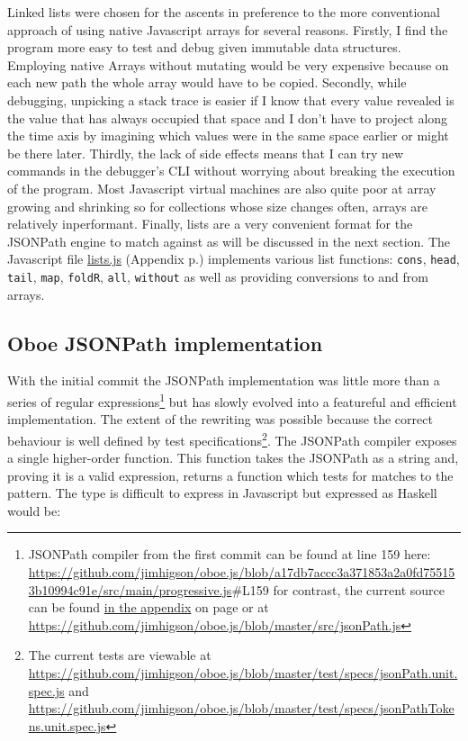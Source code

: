 \documentclass[12pt, ]{article}
\begin{document}
Linked lists were chosen for the ascents in preference to the more
conventional approach of using native Javascript arrays for several
reasons. Firstly, I find the program more easy to test and debug given
immutable data structures. Employing native Arrays without mutating
would be very expensive because on each new path the whole array would
have to be copied. Secondly, while debugging, unpicking a stack trace is
easier if I know that every value revealed is the value that has always
occupied that space and I don't have to project along the time axis by
imagining which values were in the same space earlier or might be there
later. Thirdly, the lack of side effects means that I can try new
commands in the debugger's CLI without worrying about breaking the
execution of the program. Most Javascript virtual machines are also
quite poor at array growing and shrinking so for collections whose size
changes often, arrays are relatively inperformant. Finally, lists are a
very convenient format for the JSONPath engine to match against as will
be discussed in the next section. The Javascript file
\hyperref[headerux5flists]{lists.js} (Appendix p.\pageref{src_lists})
implements various list functions: \texttt{cons}, \texttt{head},
\texttt{tail}, \texttt{map}, \texttt{foldR}, \texttt{all},
\texttt{without} as well as providing conversions to and from arrays.

\subsection{Oboe JSONPath
implementation}\label{oboe-jsonpath-implementation}

With the initial commit the JSONPath implementation was little more than
a series of regular expressions\footnote{JSONPath compiler from the
  first commit can be found at line 159 here:
  \url{https://github.com/jimhigson/oboe.js/blob/a17db7accc3a371853a2a0fd755153b10994c91e/src/main/progressive.js}\#L159
  for contrast, the current source can be found
  \hyperref[jsonPath.js]{in the appendix} on page \pageref{src_jsonPath}
  or at
  \url{https://github.com/jimhigson/oboe.js/blob/master/src/jsonPath.js}}
but has slowly evolved into a featureful and efficient implementation.
The extent of the rewriting was possible because the correct behaviour
is well defined by test specifications\footnote{The current tests are
  viewable at
  \url{https://github.com/jimhigson/oboe.js/blob/master/test/specs/jsonPath.unit.spec.js}
  and
  \url{https://github.com/jimhigson/oboe.js/blob/master/test/specs/jsonPathTokens.unit.spec.js}}.
The JSONPath compiler exposes a single higher-order function. This
function takes the JSONPath as a string and, proving it is a valid
expression, returns a function which tests for matches to the pattern.
The type is difficult to express in Javascript but expressed as Haskell
would be:
\end{document}
